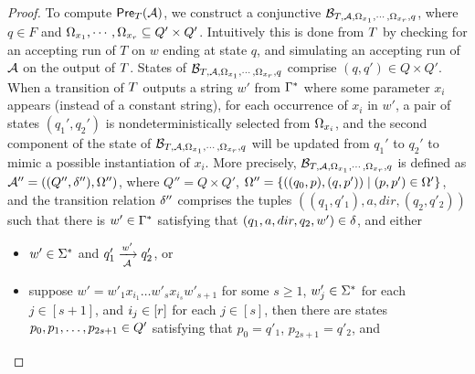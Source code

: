 \begin{proof}
To compute $\textsf{Pre}_{T}(\mathcal{A})$, we construct a conjunctive \FFA{} %
$\mathcal{B}_{T, \mathcal{A}, \Omega_{x_1}, \cdots, \Omega_{x_r}, q}$, %
%
where  $q \in F$ and  $\Omega_{x_1}, \cdots, \Omega_{x_r} \subseteq Q' \times Q'$.   
Intuitively this is done from $T$  by checking for an accepting run of $T$ on $w$ ending at state $q$, and simulating an accepting run of $\mathcal{A}$ on the output of $T$. States of $\mathcal{B}_{T, \mathcal{A}, \Omega_{x_1}, \cdots, \Omega_{x_r}, q}$ comprise $(q,q') \in Q \times Q'$. 
When a transition of $T$ outputs a string $w'$ from $\Gamma^*$ where some parameter $x_i$ appears (instead of a constant string), for each occurrence of $x_i$ in $w'$, a pair of states $(q_1', q_2')$ is nondeterministically selected from $\Omega_{x_i}$, and the second component of the state of $\mathcal{B}_{T, \mathcal{A}, \Omega_{x_1}, \cdots, \Omega_{x_r}, q}$ will be updated from $q_1'$ to $q_2'$ to mimic a possible instantiation of $x_i$.  
More precisely, $\mathcal{B}_{T, \mathcal{A}, \Omega_{x_1}, \cdots, \Omega_{x_r}, q}$ is defined as
$\mathcal{A}'' = ((Q'', \delta''), \Omega'')$, where $Q'' = Q \times Q'$, $\Omega'' = \{((q_0, p), (q, p')) \mid (p, p') \in \Omega'\}$, and the transition relation $\delta''$ comprises the tuples $((q_1, q'_1), a, dir, (q_2, q'_2))$ such that there is $w' \in \Gamma^*$ satisfying that $(q_1, a, dir, q_2, w') \in \delta$, and either
\begin{itemize}
\item $w' \in \Sigma^*$  and $q'_1 \xrightarrow[\mathcal{A}]{w'} q'_2$, or
%
\item suppose $w' = w'_1 x_{i_1} \ldots w'_{s} x_{i_{s}} w'_{s+1}$ for some $s \ge 1$, $w'_j \in \Sigma^*$ for each $j \in [s+1]$,  and $i_j \in [r]$ for each $j \in [s]$, then there are states $p_0, p_1, \ldots, p_{2s+1} \in Q'$ satisfying that $p_0 = q'_1$, $p_{2s+1} = q'_2$, and 

\end{itemize}
\end{proof}
